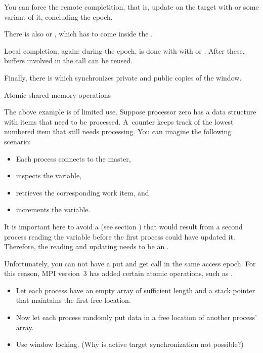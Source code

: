 You can force the remote completition, that is, update on the target
with
 or some variant of it, concluding the
epoch.

There is also
 or
, which has to come inside the
.
%

Local completion, again: during the epoch, is done with
with  or
.
After these, buffers involved in the call can be reused.
%

Finally, there is  which synchronizes
private and public copies of the window.

 {Atomic shared memory operations}

The above example is of limited use.
Suppose processor zero has a data structure 
with items that need to be processed. A~counter 
keeps track of the lowest numbered item that still needs processing.
You can imagine the following
 scenario:
\begin{itemize}
\item Each process connects to the master,
\item inspects the  variable,
\item retrieves the corresponding work item, and
\item increments the  variable.
\end{itemize}
It is important here to avoid a 
(see section ) that would result
from a second process reading the  variable 
before the first process could have updated it. Therefore, the reading
and updating needs to be an .

Unfortunately, you can not have a put and get call in the same access
epoch. For this reason, MPI version~3 has added certain atomic
operations, such as .

\begin{exercise}
  \label{ex:onesidedbuild}
  \begin{itemize}
  \item
    Let each process have an empty array of sufficient length and a
    stack pointer that maintains the first free location.
  \item
    Now let each process randomly put data in a free location of another
    process' array.
  \item Use window locking. (Why is active target synchronization not possible?)
  \end{itemize}
\end{exercise}

